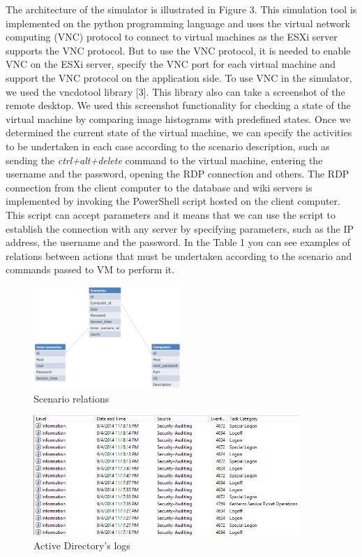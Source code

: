 The architecture of the simulator is illustrated in Figure 3. This simulation tool is implemented on the python programming language and uses the virtual network computing (VNC) protocol to connect to virtual machines as the ESXi server supports the VNC protocol. But to use the VNC protocol, it is needed to enable VNC on the ESXi server, specify the VNC port for each virtual machine and support the VNC protocol on the application side. To use VNC in the simulator, we used the vncdotool library [3]. This library also can take a screenshot of the remote desktop. We used this screenshot functionality for checking a state of the virtual machine by comparing image histograms with predefined states. Once we determined the current state of the virtual machine, we can specify the activities to be undertaken in each case according to the scenario description, such as sending the \textit{ctrl+alt+delete} command to the virtual machine, entering the username and the password, opening the RDP connection and others. The RDP connection from the client computer to the database and wiki servers is implemented by invoking the PowerShell script hosted on the client computer. This script can accept parameters and it means that we can use the script to establish the connection with any server by specifying parameters, such as the IP address, the username and the password. In the Table 1 you can see examples of relations between actions that must be undertaken according to the scenario and commands passed to VM to perform it.



\begin{figure}[ht!]
\centering
\includegraphics[width=0.5\textwidth]{figures/scenario_relations.png}
\caption{Scenario relations}
\label{overflow}
\end{figure}


\begin{figure}[ht!]
\centering
\includegraphics[width=0.9\textwidth]{figures/active_directory_logs_result.png}
\caption{Active Directory's logs}
\label{overflow}
\end{figure}



